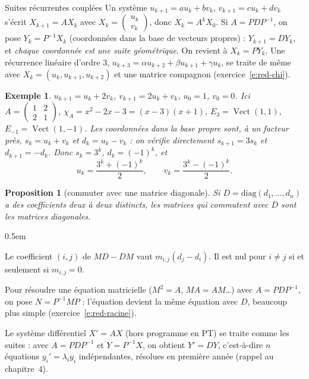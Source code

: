 \documentclass[a4paper,11pt]{article}
\makeatletter
\numberwithin{equation}{section}
\numberwithin{figure}{section}
\numberwithin{table}{section}
\theoremstyle{enonce}
\newtheorem{proposition}[definition]{Proposition}
\theoremstyle{exemple}
\newtheorem{exemple}[definition]{Exemple}
\theoremstyle{remarque}
\renewcommand{\proofname}{Démonstration}
\renewenvironment{proof}[1][\proofname]{\par\pushQED{\qed}\normalfont
  \topsep0.5em\relax\trivlist\item[\hskip\labelsep\sffamily\itshape\color{Gris}#1.]\ignorespaces}
  {\popQED\endtrivlist\@endpefalse}
\newcommand{\vect}{\operatorname{Vect}}
\makeatother
\begin{document}
\begin{methode}{Suites récurrentes couplées}\label{m:suites}
Un système $u_{k+1}=au_k+bv_k$, $v_{k+1}=cu_k+dv_k$ s'écrit $X_{k+1}=AX_k$ avec $X_k=\begin{pmatrix}u_k\\v_k\end{pmatrix}$, donc
$X_k=A^kX_0$. Si $A=PDP^{-1}$, on pose $Y_k=P^{-1}X_k$ (coordonnées dans la base de vecteurs propres) : $Y_{k+1}=DY_k$, et
\emph{chaque coordonnée est une suite géométrique}. On revient à $X_k=PY_k$.
Une récurrence linéaire d'ordre $3$, $u_{k+3}=\alpha u_{k+2}+\beta u_{k+1}+\gamma u_k$, se traite de même avec
$X_k=(u_k,u_{k+1},u_{k+2})$ et une matrice compagnon (exercice~\ref{e:red-chi}).
\end{methode}

\begin{exemple}
$u_{k+1}=u_k+2v_k$, $v_{k+1}=2u_k+v_k$, $u_0=1$, $v_0=0$. Ici $A=\begin{pmatrix}1&2\\2&1\end{pmatrix}$, $\chi_A=x^2-2x-3=(x-3)(x+1)$,
$E_3=\vect(1,1)$, $E_{-1}=\vect(1,-1)$. Les coordonnées dans la base propre sont, à un facteur près, $s_k=u_k+v_k$ et
$d_k=u_k-v_k$ : on vérifie directement $s_{k+1}=3s_k$ et $d_{k+1}=-d_k$. Donc $s_k=3^k$, $d_k=(-1)^k$, et
\[u_k=\frac{3^k+(-1)^k}2,\qquad v_k=\frac{3^k-(-1)^k}2.\]
\end{exemple}

\begin{proposition}[commuter avec une matrice diagonale]\label{p:commute}
Si $D=\mathrm{diag}(d_1,\dots,d_n)$ a des coefficients \emph{deux à deux distincts}, les matrices qui commutent avec $D$ sont les
matrices diagonales.
\end{proposition}

\begin{proof}
Le coefficient $(i,j)$ de $MD-DM$ vaut $m_{i,j}(d_j-d_i)$. Il est nul pour $i\neq j$ si et seulement si $m_{i,j}=0$.
\end{proof}

\begin{enpratique}
Pour résoudre une équation matricielle ($M^2=A$, $MA=AM$\dots) avec $A=PDP^{-1}$, on pose $N=P^{-1}MP$ : l'équation devient la
même équation avec $D$, beaucoup plus simple (exercice~\ref{e:red-racine}).
\end{enpratique}

\begin{plusloin}
Le système différentiel $X'=AX$ (hors programme en PT) se traite comme les suites : avec $A=PDP^{-1}$ et $Y=P^{-1}X$, on obtient
$Y'=DY$, c'est-à-dire $n$ équations $y_i'=\lambda_iy_i$ indépendantes, résolues en première année (rappel au chapitre~4).
\end{plusloin}
\end{document}
